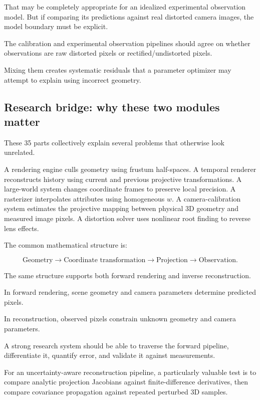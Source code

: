 That may be completely appropriate for an idealized experimental observation model. But if comparing its predictions against real distorted camera images, the model boundary must be explicit.

The calibration and experimental observation pipelines should agree on whether observations are raw distorted pixels or rectified/undistorted pixels.

Mixing them creates systematic residuals that a parameter optimizer may attempt to explain using incorrect geometry.

\subsection{Research bridge: why these two modules matter}\label{02-foundations-ii-ch037-research-bridge-why-these-two-modules-matter}

\hypertarget{02-foundations-ii-ch037-research-bridge-why-these-two-modules-matter}{}

These 35 parts collectively explain several problems that otherwise look unrelated.

A rendering engine culls geometry using frustum half-spaces. A temporal renderer reconstructs history using current and previous projective transformations. A large-world system changes coordinate frames to preserve local precision. A rasterizer interpolates attributes using homogeneous \(w\). A camera-calibration system estimates the projective mapping between physical 3D geometry and measured image pixels. A distortion solver uses nonlinear root finding to reverse lens effects.

The common mathematical structure is:

\[
 \boxed{ \text{Geometry} \rightarrow \text{Coordinate transformation} \rightarrow \text{Projection} \rightarrow \text{Observation} }.
\]

The same structure supports both forward rendering and inverse reconstruction.

In forward rendering, scene geometry and camera parameters determine predicted pixels.

In reconstruction, observed pixels constrain unknown geometry and camera parameters.

A strong research system should be able to traverse the forward pipeline, differentiate it, quantify error, and validate it against measurements.

For an uncertainty-aware reconstruction pipeline, a particularly valuable test is to compare analytic projection Jacobians against finite-difference derivatives, then compare covariance propagation against repeated perturbed 3D samples.

